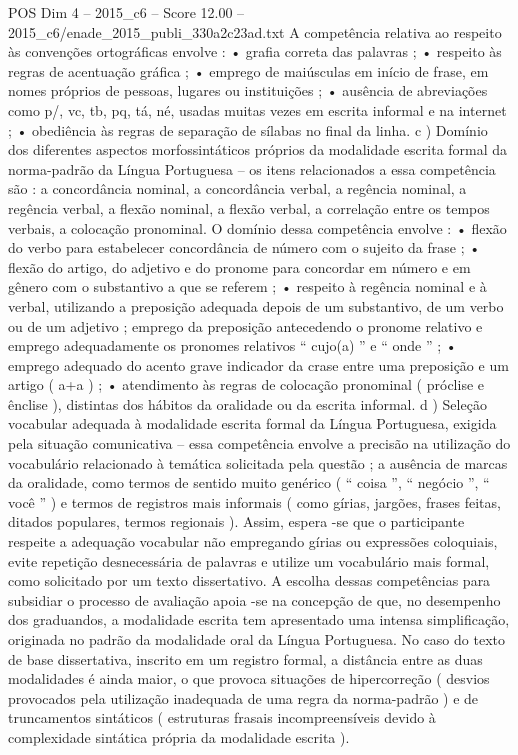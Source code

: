 \begin{textsample}{POS Dim 4 – 2015\_c6 – Score 12.00 – 2015\_c6/enade\_2015\_publi\_330a2c23ad.txt}
A competência relativa ao respeito às convenções ortográficas envolve : • grafia correta das palavras ; • respeito às regras de acentuação gráfica ; • emprego de maiúsculas em início de frase, em nomes próprios de pessoas, lugares ou instituições ; • ausência de abreviações como p/, vc, tb, pq, tá, né, usadas muitas vezes em escrita informal e na internet ; • obediência às regras de separação de sílabas no final da linha. c ) Domínio dos diferentes aspectos morfossintáticos próprios da modalidade escrita formal da norma-padrão da Língua Portuguesa – os itens relacionados a essa competência são : a concordância nominal, a concordância verbal, a regência nominal, a regência verbal, a flexão nominal, a flexão verbal, a correlação entre os tempos verbais, a colocação pronominal.
O domínio dessa competência envolve : • flexão do verbo para estabelecer concordância de número com o sujeito da frase ; • flexão do artigo, do adjetivo e do pronome para concordar em número e em gênero com o substantivo a que se referem ; • respeito à regência nominal e à verbal, utilizando a preposição adequada depois de um substantivo, de um verbo ou de um adjetivo ; emprego da preposição antecedendo o pronome relativo e emprego adequadamente os pronomes relativos “ cujo(a) ” e “ onde ” ; • emprego adequado do acento grave indicador da crase entre uma preposição e um artigo ( a+a ) ; • atendimento às regras de colocação pronominal ( próclise e ênclise ), distintas dos hábitos da oralidade ou da escrita informal. d ) Seleção vocabular adequada à modalidade escrita formal da Língua Portuguesa, exigida pela situação comunicativa – essa competência envolve a precisão na utilização do vocabulário relacionado à temática solicitada pela questão ; a ausência de marcas da oralidade, como termos de sentido muito genérico ( “ coisa ”, “ negócio ”, “ você ” ) e termos de registros mais informais ( como gírias, jargões, frases feitas, ditados populares, termos regionais ).
Assim, espera -se que o participante respeite a adequação vocabular não empregando gírias ou expressões coloquiais, evite repetição desnecessária de palavras e utilize um vocabulário mais formal, como solicitado por um texto dissertativo.
A escolha dessas competências para subsidiar o processo de avaliação apoia -se na concepção de que, no desempenho dos graduandos, a modalidade escrita tem apresentado uma intensa simplificação, originada no padrão da modalidade oral da Língua Portuguesa.
No caso do texto de base dissertativa, inscrito em um registro formal, a distância entre as duas modalidades é ainda maior, o que provoca situações de hipercorreção ( desvios provocados pela utilização inadequada de uma regra da norma-padrão ) e de truncamentos sintáticos ( estruturas frasais incompreensíveis devido à complexidade sintática própria da modalidade escrita ).

\end{textsample}
